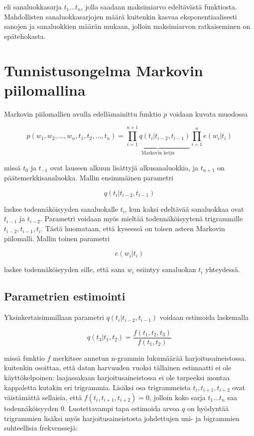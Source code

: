 \documentclass[utf8,bachelor,manualbib]{gradu3}
\begin{document}
eli sanaluokkasarja $ t_1 \ldots t_n $, jolla saadaan maksimiarvo edeltävästä funktiosta. Mahdollisten sanaluokkasarjojen määrä kuitenkin kasvaa eksponentiaalisesti sanojen ja sanaluokkien määrän mukaan, jolloin maksimiarvon ratkaiseminen on epätehokasta.


\section{Tunnistusongelma Markovin piilomallina}

Markovin piilomallien avulla edellämainittu funktio $ p $ voidaan kuvata muodossa

\[
p(w_1, w_2, \ldots, w_n, t_1, t_2, \ldots, t_n) = \underbrace{\prod_{i=1}^{n+1} q(t_i | t_{i-2}, t_{i-1})}_\text{Markovin ketju}\prod_{i=1}^{n}e(w_i | t_i)
\]

missä $t_0$ ja $t_{-1}$ ovat lauseen alkuun lisättyjä alkusanaluokkia, ja $t_{n+1}$ on päätemerkkisanaluokka. Mallin ensimmäinen parametri

\[
q(t_i | t_{i-2}, t_{i-1})
\]

laskee todennäköisyyden sanaluokalle $t_i$, kun kaksi edeltävää sanaluokkaa ovat $t_{i-1}$ ja $t_{i-2}$. Parametri voidaan myös mieltää todennäköisyytenä trigrammille $t_{i-2}, t_{i-1}, t_i $. Tästä huomataan, että kyseessä on toisen asteen Markovin piilomalli. Mallin toinen parametri

\[
e(w_i | t_i)
\]

laskee todennäköisyyden sille, että sana $w_i$ esiintyy sanaluokan $t_i$ yhteydessä.


\subsection{Parametrien estimointi}

Yksinkertaisimmillaan parametri $q(t_i|t_{i-2},t_{i-1})$ voidaan estimoida laskemalla

\[
q(t_3|t_1,t_2) = \frac{f(t_1,t_2,t_3)}{f(t_1,t_2)}
\]

missä funktio $f$ merkitsee annetun n-grammin lukumäärää harjoitusaineistossa. \citet{brants2000} kuitenkin osoittaa, että datan harvuuden vuoksi tällainen estimaatti ei ole käyttökelpoinen: laajassakaan harjoitusaineistossa ei ole tarpeeksi montaa kappaletta kutakin eri trigrammia. Lisäksi osa trigrammeista $t_i,t_{i+1},t_{i+2}$ ovat väistämättä sellaisia, että $f(t_i,t_{i+1},t_{i+2}) = 0$, jolloin koko sarja $t_1 \ldots t_n$ saa todennäköisyyden $0$. Luotettavampi tapa estimoida arvoa $q$ on hyödyntää trigrammien lisäksi myös harjoitusaineistosta johdettujen uni- ja bigrammien suhteellisia frekvenssejä:
\end{document}
